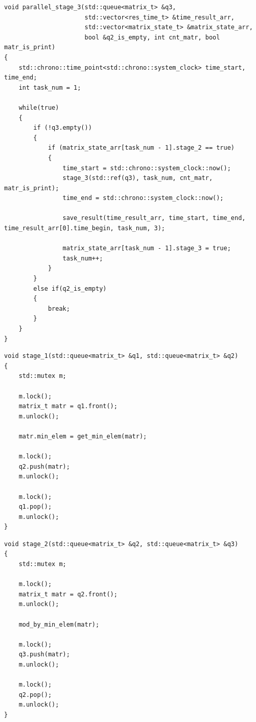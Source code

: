 \documentclass[a4paper,14pt, unknownkeysallowed]{extreport}
\begin{document}
\clearpage

\begin{center}
\captionsetup{justification=raggedright,singlelinecheck=off}
\begin{lstlisting}[label=lst:parallel_stage_3,caption=Функция 3-ей ленты конвейерной обработки матрицы]
void parallel_stage_3(std::queue<matrix_t> &q3, 
                      std::vector<res_time_t> &time_result_arr,
                      std::vector<matrix_state_t> &matrix_state_arr, 
                      bool &q2_is_empty, int cnt_matr, bool matr_is_print)
{
    std::chrono::time_point<std::chrono::system_clock> time_start, time_end;
    int task_num = 1;

    while(true)
    {      
        if (!q3.empty())
        {   
            if (matrix_state_arr[task_num - 1].stage_2 == true)
            {
                time_start = std::chrono::system_clock::now();
                stage_3(std::ref(q3), task_num, cnt_matr, matr_is_print);
                time_end = std::chrono::system_clock::now();

                save_result(time_result_arr, time_start, time_end, time_result_arr[0].time_begin, task_num, 3);

                matrix_state_arr[task_num - 1].stage_3 = true;
                task_num++;
            }
        }
        else if(q2_is_empty)
        {
            break;
        } 
    }
}
\end{lstlisting}
\end{center}

\clearpage

\begin{center}
\captionsetup{justification=raggedright,singlelinecheck=off}
\begin{lstlisting}[label=lst:stage_1,caption=Функция реализации 1-ого этапа обработки матрицы]
void stage_1(std::queue<matrix_t> &q1, std::queue<matrix_t> &q2)
{
	std::mutex m;

	m.lock();
	matrix_t matr = q1.front();
	m.unlock();

	matr.min_elem = get_min_elem(matr);

	m.lock();
	q2.push(matr);
	m.unlock();

	m.lock();
	q1.pop();
	m.unlock();
}
\end{lstlisting}
\end{center}

\begin{center}
\captionsetup{justification=raggedright,singlelinecheck=off}
\begin{lstlisting}[label=lst:stage_2,caption=Функция реализации 2-ого этапа обработки матрицы]
void stage_2(std::queue<matrix_t> &q2, std::queue<matrix_t> &q3)
{
	std::mutex m;

	m.lock();
	matrix_t matr = q2.front();
	m.unlock();

	mod_by_min_elem(matr);
	
	m.lock();
	q3.push(matr);
	m.unlock();
	
	m.lock();
	q2.pop();
	m.unlock();
}
\end{lstlisting}
\end{center}
\end{document}
